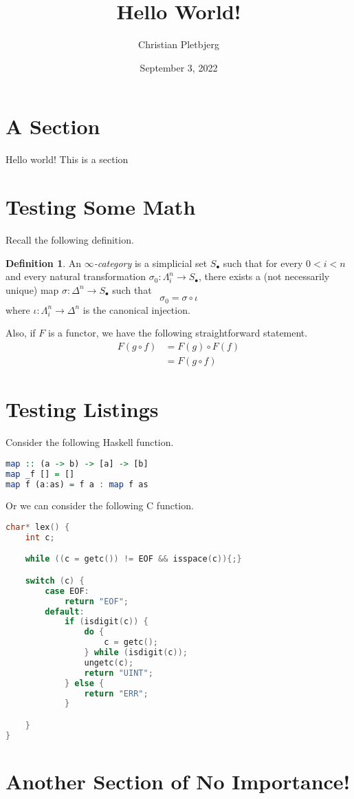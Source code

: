 \documentclass{article}
\title{Hello World!}
\author{Christian Pletbjerg}
\date{September 3, 2022}
\theoremstyle{plain}%
\theoremstyle{definition}
\newtheorem{defn}{Definition}[section]
\theoremstyle{remark}
\begin{document}
\maketitle

\tableofcontents

\section{A Section}
Hello world! This is a section

\section{Testing Some Math}
Recall the following definition.
\begin{defn}
    An \emph{$\infty$-category} is a simplicial set $S_\bullet$ such that
    for every $ 0 < i < n$ and every natural transformation $\sigma_0 : \Lambda^n_i \to S_\bullet$, there exists a (not necessarily unique) map $\sigma : \Delta^n \to S_\bullet$
    such that
    \[
        \sigma_0 = \sigma \circ \iota
    \]
    where $\iota : \Lambda^n_i \to \Delta^n$ is the canonical injection.
\end{defn}

Also, if $F$ is a functor, we have the following straightforward statement.
\[
\begin{aligned}
    F( g \circ f ) 
        &=  F( g ) \circ F (f ) \\
        &=  F( g \circ f ) 
\end{aligned}
\]

\section{Testing Listings}
Consider the following Haskell function.
\begin{lstlisting}[language=Haskell]
map :: (a -> b) -> [a] -> [b]
map _f [] = []
map f (a:as) = f a : map f as
\end{lstlisting}

Or we can consider the following C function.
\begin{lstlisting}[language=C]
char* lex() {
    int c; 

    while ((c = getc()) != EOF && isspace(c)){;}

    switch (c) {
        case EOF:
            return "EOF";
        default:
            if (isdigit(c)) {
                do {
                    c = getc();
                } while (isdigit(c));
                ungetc(c);
                return "UINT";
            } else {
                return "ERR";
            }

    }
}
\end{lstlisting}

\section{Another Section of No Importance!}
\end{document}
